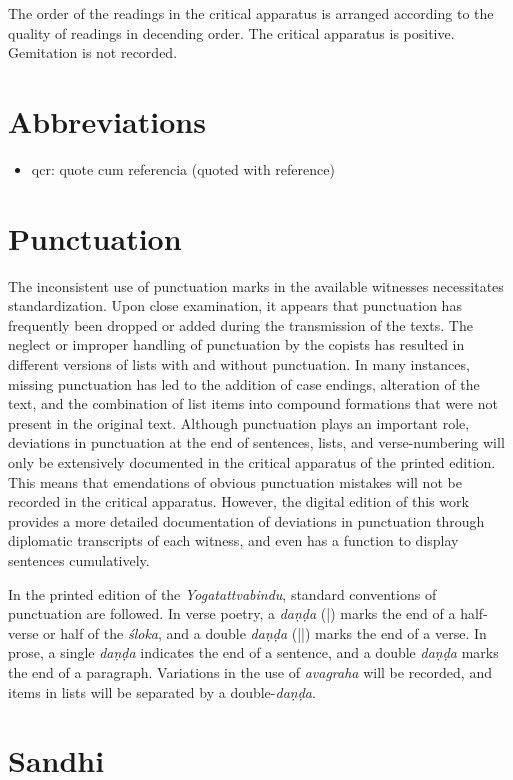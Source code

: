 {The order of the readings in the critical apparatus is arranged according to the quality of readings in decending order. The critical apparatus is positive. Gemitation is not recorded. 

\section{Abbreviations}
\begin{itemize}
  \item qcr: quote cum referencia (quoted with reference)
  \end{itemize}

\section{Punctuation}

The inconsistent use of punctuation marks in the available witnesses necessitates standardization. Upon close examination, it appears that punctuation has frequently been dropped or added during the transmission of the texts. The neglect or improper handling of punctuation by the copists has resulted in different versions of lists with and without punctuation. In many instances, missing punctuation has led to the addition of case endings, alteration of the text, and the combination of list items into compound formations that were not present in the original text. Although punctuation plays an important role, deviations in punctuation at the end of sentences, lists, and verse-numbering will only be extensively documented in the critical apparatus of the printed edition. This means that emendations of obvious punctuation mistakes will not be recorded in the critical apparatus. However, the digital edition of this work provides a more detailed documentation of deviations in punctuation through diplomatic transcripts of each witness, and even has a function to display sentences cumulatively.

In the printed edition of the \textit{Yogatattvabindu}, standard conventions of punctuation are followed. In verse poetry, a \textit{daṇḍa} (|) marks the end of a half-verse or half of the \textit{śloka}, and a double \textit{daṇḍa} (||) marks the end of a verse. In prose, a single \textit{daṇḍa} indicates the end of a sentence, and a double \textit{daṇḍa} marks the end of a paragraph. Variations in the use of \textit{avagraha} will be recorded, and items in lists will be separated by a double-\textit{daṇḍa}.

\section{Sandhi}

}
